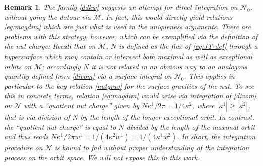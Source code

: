 \documentclass[a4paper,10pt,reqno]{amsart}
\newcommand{\cM}{\mathcal{M}}
\newcommand{\cN}{\mathcal{N}}
\theoremstyle{plain}
\newtheorem{remark}[thm]{Remark}
\numberwithin{equation}{section}
\begin{document}
\begin{remark} \label{quotint}
The family \eqref{ddkw} suggests an attempt for direct integration on $\cN_0$, without going the detour via $\cM$. In fact, this would directly yield relations \eqref{eq:magdim} which are just what is used in the uniqueness arguments. There are  problems with this strategy, however, which can be exemplified via the definition of the nut charge: Recall that on $\cM$, $N$ is defined as the flux of \eqref{eq:JT-def} through a hypersurface which may contain or intersect both maximal as well as exceptional orbits on $\cM$; accordingly $N$ it is not related in an obvious way to an analogous quantity defined from \eqref{divom} via a surface integral on $\cN_0$. This applies in particular to the key relation \eqref{nutgrav} for the surface gravities of the nut. To see this in concrete terms, relation \eqref{eq:magdim} would arise via integration of \eqref{divom} on $\cN$ with a ``quotient nut charge'' given by $N \kappa^1 /2\pi = 1/4 \kappa^2 $, where $|\kappa^1| \geq |\kappa^2|$, that is via division of $N$ by the length of the \emph{longer exceptional} orbit. In contrast, the ``quotient nut charge'' \cite[Eq. (5.9)]{gibbons:hawking:1979} is equal to  $N$ divided by the length of the \emph{maximal} orbit and thus reads $N \kappa^1 /2\pi w^1 = 1/(4 \kappa^2  w^1) =  1/(4 \kappa^1 w^2)$. In short, the integration procedure on $\cN$ is bound to fail without proper understanding of the integration process on the orbit space. We will not expose this in this work.
\end{remark}



\newcommand{\arxivref}[1]{\href{http://www.arxiv.org/abs/#1}{{arXiv:#1}}}
\newcommand{\prd}{Phys. Rev. D} 
%
%
\end{document}
